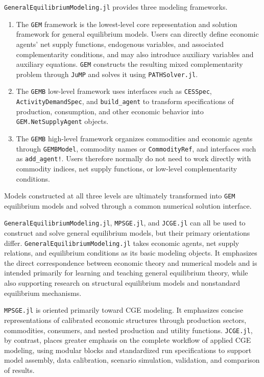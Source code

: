 \documentclass[
  letterpaper,
  DIV=11,
  numbers=noendperiod]{scrreprt}
\begin{document}
\texttt{GeneralEquilibriumModeling.jl} provides three modeling
frameworks.

\begin{enumerate}
\def\labelenumi{\arabic{enumi}.}
\item
  The \texttt{GEM} framework is the lowest-level core representation and
  solution framework for general equilibrium models. Users can directly
  define economic agents' net supply functions, endogenous variables,
  and associated complementarity conditions, and may also introduce
  auxiliary variables and auxiliary equations. \texttt{GEM} constructs
  the resulting mixed complementarity problem through \texttt{JuMP} and
  solves it using \texttt{PATHSolver.jl}.
\item
  The \texttt{GEMB} low-level framework uses interfaces such as
  \texttt{CESSpec}, \texttt{ActivityDemandSpec}, and
  \texttt{build\_agent} to transform specifications of production,
  consumption, and other economic behavior into
  \texttt{GEM.NetSupplyAgent} objects.
\item
  The \texttt{GEMB} high-level framework organizes commodities and
  economic agents through \texttt{GEMBModel}, commodity names or
  \texttt{CommodityRef}, and interfaces such as \texttt{add\_agent!}.
  Users therefore normally do not need to work directly with commodity
  indices, net supply functions, or low-level complementarity
  conditions.
\end{enumerate}

Models constructed at all three levels are ultimately transformed into
\texttt{GEM} equilibrium models and solved through a common numerical
solution interface.

\texttt{GeneralEquilibriumModeling.jl}, \texttt{MPSGE.jl}, and
\texttt{JCGE.jl} can all be used to construct and solve general
equilibrium models, but their primary orientations differ.
\texttt{GeneralEquilibriumModeling.jl} takes economic agents, net supply
relations, and equilibrium conditions as its basic modeling objects. It
emphasizes the direct correspondence between economic theory and
numerical models and is intended primarily for learning and teaching
general equilibrium theory, while also supporting research on structural
equilibrium models and nonstandard equilibrium mechanisms.

\texttt{MPSGE.jl} is oriented primarily toward CGE modeling. It
emphasizes concise representations of calibrated economic structures
through production sectors, commodities, consumers, and nested
production and utility functions. \texttt{JCGE.jl}, by contrast, places
greater emphasis on the complete workflow of applied CGE modeling, using
modular blocks and standardized run specifications to support model
assembly, data calibration, scenario simulation, validation, and
comparison of results.
\end{document}
